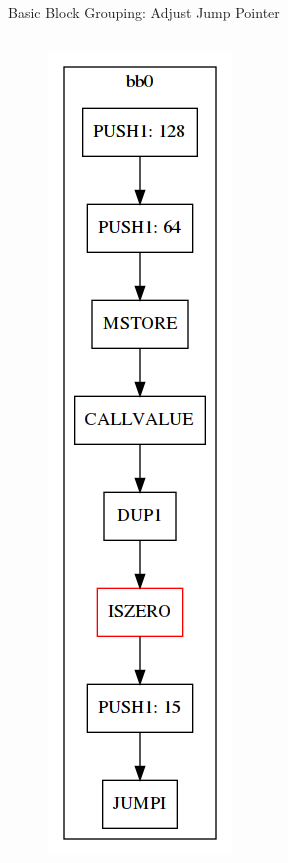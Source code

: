 \documentclass[11pt]{beamer}
\begin{document}
\begin{frame}{Basic Block Grouping: Adjust Jump Pointer}
\begin{columns}
{\begin{figure}
        \includegraphics[scale=0.25]{figures/stack/cfg_stack6.png}
    \end{figure}
}
\end{columns}
\end{frame}
\end{document}
